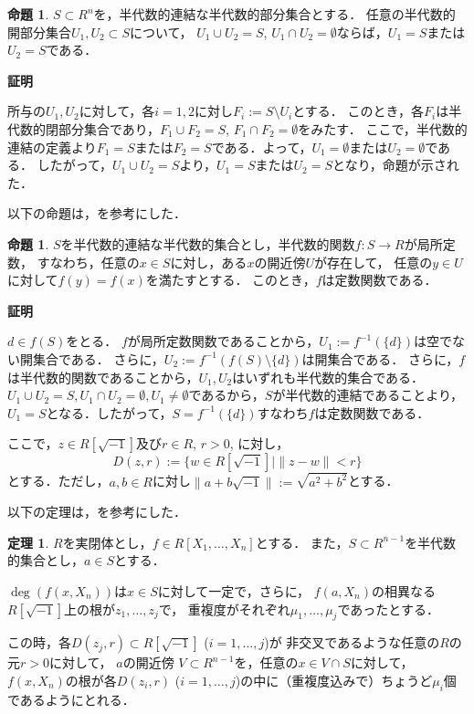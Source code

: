 \documentclass[uplatex, dvipdfmx]{jsarticle}
\makeatletter
\numberwithin{equation}{section}
\renewenvironment{proof}[1][\proofname]{\par
  \pushQED{\qed}%
  \normalfont \topsep6\p@\@plus6\p@\relax
  \trivlist
  \item\relax
  {\bfseries
  #1\@addpunct{.}}\hspace\labelsep\ignorespaces
}{
  \popQED\endtrivlist\@endpefalse
}
\newcommand{\map}[3]{{#1}\colon{#2}\rightarrow{#3}}
\newcommand{\norm}[1]{\| {#1} \|}
\theoremstyle{definition}
\newtheorem{proposition}[definition]{命題}
\newtheorem{theorem}[definition]{定理}
\renewcommand{\proofname}{\textbf{証明}}
\makeatother
\begin{document}
\begin{proposition}
     $S \subset R^n$を，半代数的連結な半代数的部分集合とする．
     任意の半代数的開部分集合$U_1, U_2 \subset S$について，
     $U_1 \cup U_2 = S$, $U_1 \cap U_2 = \emptyset$ならば，$U_1 = S$または$U_2 = S$である．
\end{proposition}

\begin{proof}
     所与の$U_1, U_2$に対して，各$i=1, 2$に対し$F_i:= S \setminus U_i$とする．
     このとき，各$F_i$は半代数的閉部分集合であり，$F_1 \cup F_2 = S$, $F_1 \cap F_2 = \emptyset$をみたす．
     ここで，半代数的連結の定義より$F_1 = S$または$F_2 = S$である．よって，$U_1 = \emptyset$または$U_2 = \emptyset$である．
     したがって，$U_1 \cup U_2 = S$より，$U_1 = S$または$U_2 = S$となり，命題が示された．
\end{proof}


以下の命題は，\cite[Proposition 3.9.]{MR2248869}を参考にした．
\begin{proposition}
     $S$を半代数的連結な半代数的集合とし，半代数的関数$\map{f}{S}{R}$が局所定数，
     すなわち，任意の$x \in S$に対し，ある$x$の開近傍$U$が存在して，
     任意の$y \in U$に対して$f(y)=f(x)$を満たすとする．
     このとき，$f$は定数関数である．
\end{proposition}
\begin{proof}
     $d \in f(S)$をとる．
     $f$が局所定数関数であることから，$U_1:=f^{-1}(\{d\})$は空でない開集合である．
     さらに，$U_2:=f^{-1}(f(S) \setminus \{d\})$は開集合である．
     さらに，$f$は半代数的関数であることから，$U_1, U_2$はいずれも半代数的集合である．
     $U_1 \cup U_2 = S, U_1 \cap U_2 = \emptyset, U_1 \neq \emptyset$であるから，$S$が半代数的連結であることより，
     $U_1 = S$となる．したがって，$S = f^{-1}(\{d\})$すなわち$f$は定数関数である．
\end{proof}

ここで，$z \in R\left[ \sqrt{-1} \right]$及び$r \in R$, $r>0$, に対し，
\begin{equation}
     D(z, r):= \{w \in R\left[\sqrt{-1}\right] \mid \norm{z - w} < r\}
\end{equation}
とする．ただし，$a,b \in R$に対し$\norm{a + b\sqrt{-1}} := \sqrt{a^2 + b^2}$とする．

以下の定理は，\cite[Theorem 5.12.]{MR2248869}を参考にした．

\begin{theorem} \label{theorem:continuity-of-roots}
     $R$を実閉体とし，$f \in R[X_1, \dots, X_n]$とする．
     また，$S \subset R^{n-1}$を半代数的集合とし，$a \in S$とする．

     $\deg (f(x,X_n))$は$x \in S$に対して一定で，さらに，
     $f(a,X_n)$の相異なる$R\left[\sqrt{-1} \right]$上の根が$z_1, \dots, z_j$で，
     重複度がそれぞれ$\mu_1, \dots, \mu_j$であったとする．

     この時，各$D(z_j, r) \subset R\left[ \sqrt{-1} \right]$ ($i=1, \dots, j$)が
     非交叉であるような任意の$R$の元$r > 0$に対して，
     $a$の開近傍 $V \subset R^{n-1}$を，任意の$x \in V \cap S$に対して，
     $f(x, X_n)$の根が各$D(z_i, r)$ ($i=1, \dots, j$)の中に（重複度込みで）ちょうど$\mu_i$個であるようにとれる．

\end{theorem}
\end{document}
